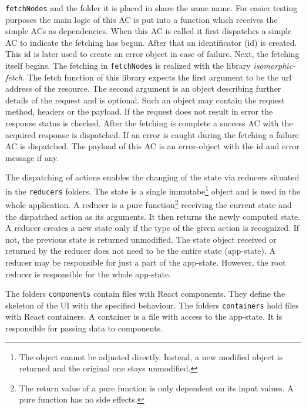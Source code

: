 \texttt{fetchNodes} and the folder it is placed in share the same name. For easier testing purposes the main logic of this AC is put into a function which receives the simple ACs as dependencies. When this AC is called it first dispatches a simple AC to indicate the fetching has begun. After that an identificator (id) is created. This id is later used to create an error object in case of failure. Next, the fetching itself begins. The fetching in \texttt{fetchNodes} is realized with the library \textit{isomorphic-fetch}. The fetch function of this library expects the first argument to be the url address of the resource. The second argument is an object describing further details of the request and is optional. Such an object may contain the request method, headers or the payload. If the request does not result in error the response status is checked. After the fetching is complete a success AC with the acquired response is dispatched. If an error is caught during the fetching a failure AC is dispatched. The payload of this AC is an error-object with the id and error message if any.

The dispatching of actions enables the changing of the state via reducers situated in the \texttt{reducers} folders. The state is a single immutabe\footnote{The object cannot be adjusted directly. Instead, a new modified object is returned and the original one stays unmodified.} object and is used in the whole application. A \hypertarget{reducers}{reducer} is a pure function\footnote{The return value of a pure function is only dependent on its input values. A pure function has no side effects.} receiving the current state and the dispatched action as its arguments. It then returns the newly computed state. A reducer creates a new state only if the type of the given action is recognized. If not, the previous state is returned unmodified. The state object received or returned by the reducer does not need to be the entire state (app-state). A reducer may be responsible for just a part of the app-state. However, the root reducer is responsible for the whole app-state.

The folders \texttt{components} contain files with React components. They define the skeleton of the UI with the specified behaviour. The folders \texttt{containers} hold files with React containers. A container is a file with access to the app-state. It is responsible for passing data to components. 

